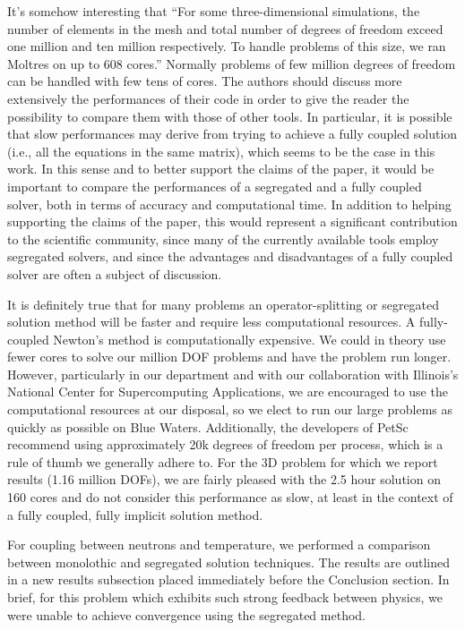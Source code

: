 \documentclass[answers,11pt]{exam}
\begin{document}
\begin{questions}
\question It's somehow interesting that ``For some three-dimensional
simulations, the number of elements in the mesh and total number of degrees of
freedom exceed one million and ten million respectively. To handle problems of
this size, we ran Moltres on up to 608 cores.'' Normally problems of few million
degrees of freedom can be handled with few tens of cores. The authors should
discuss more extensively the performances of their code in order to give the
reader the possibility to compare them with those of other tools. In particular,
it is possible that slow performances may derive from trying to achieve a fully
coupled solution (i.e., all the equations in the same matrix), which seems to be
the case in this work. In this sense and to better support the claims of the
paper, it would be important to compare the performances of a segregated and a
fully coupled solver, both in terms of accuracy and computational time. In
addition to helping supporting the claims of the paper, this would represent a
significant contribution to the scientific community, since many of the
currently available tools employ segregated solvers, and since the advantages
and disadvantages of a fully coupled solver are often a subject of discussion.
\begin{solution}
        It is definitely true that for many problems an operator-splitting or
        segregated solution method will be faster and require less
        computational resources. A fully-coupled Newton's method is
        computationally expensive. We could in theory use fewer cores to solve
        our million DOF problems and have the problem run longer. However,
        particularly in our department and with our collaboration with Illinois's
        National Center for Supercomputing Applications, we are encouraged to
        use the computational resources at our disposal, so we elect to run our
        large problems as quickly as possible on Blue Waters. Additionally, the
        developers of PetSc recommend using approximately 20k degrees of freedom
        per process, which is a rule of thumb we generally adhere to. For the 3D
        problem for which we report results (1.16 million DOFs), we are fairly
        pleased with the 2.5 hour solution on 160 cores and do not consider this
        performance as slow, at least in the context of a fully coupled, fully
        implicit solution method.

        For coupling between neutrons and temperature, we performed a comparison
        between monolothic and segregated solution techniques. The results are
        outlined in a new results subsection placed immediately before the
        Conclusion section. In brief, for this problem which exhibits such strong
        feedback between physics, we were unable to achieve convergence using the
        segregated method.
\end{solution}



\end{questions}
\end{document}
